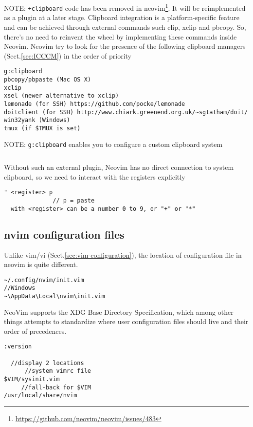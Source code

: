 NOTE: \verb!+clipboard! code has been removed in
neovim\footnote{\url{https://github.com/neovim/neovim/issues/483}}. It will be
reimplemented as a plugin at a later stage. Clipboard integration is a
platform-specific feature and can be achieved through external commands such
clip, xclip and pbcopy. So, there's no need to reinvent the wheel by
implementing these commands inside Neovim. Neovim try to look for the presence
of the following clipboard managers (Sect.\ref{sec:ICCCM}) in the order of
priority
\begin{verbatim}
g:clipboard
pbcopy/pbpaste (Mac OS X)
xclip
xsel (newer alternative to xclip)
lemonade (for SSH) https://github.com/pocke/lemonade
doitclient (for SSH) http://www.chiark.greenend.org.uk/~sgtatham/doit/
win32yank (Windows)
tmux (if $TMUX is set)
\end{verbatim}
NOTE: \verb!g:clipboard! enables you to configure a custom clipboard system
\begin{verbatim}

\end{verbatim}


Without such an external plugin,
Neovim has no direct connection to system clipboard, so we need to interact with
the registers explicitly
\begin{verbatim}
" <register> p   
              // p = paste
  with <register> can be a number 0 to 9, or "+" or "*"
\end{verbatim}



\subsection{nvim configuration files}
\label{sec:nvim-configuration}

Unlike vim/vi (Sect.\ref{sec:vim-configuration}), the location of configuration
file in neovim is quite different.
\begin{verbatim}
~/.config/nvim/init.vim
//Windows
~\AppData\Local\nvim\init.vim
\end{verbatim}
NeoVim supports the XDG Base Directory Specification, which among other things
attempts to standardize where user configuration files should live and their
order of precedences. 

\begin{verbatim}
:version

  //display 2 locations
      //system vimrc file
$VIM/sysinit.vim 
     //fall-back for $VIM
/usr/local/share/nvim
\end{verbatim}


